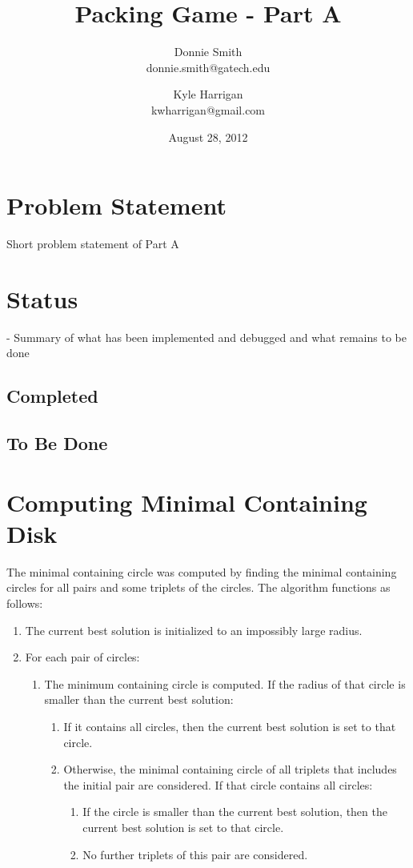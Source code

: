 \documentclass[a4paper]{article}
\title{Packing Game - Part A}
\author{
Donnie Smith \\
donnie.smith@gatech.edu
  \and 
Kyle Harrigan \\
kwharrigan@gmail.com
}
\date{August 28, 2012}                                           %
\begin{document}
\maketitle

 \section{Problem Statement}
  
 Short problem statement of Part A
 
 \section{Status}
  - Summary of what has been implemented and debugged and what remains to be done
  
 \subsection{Completed}
 
 \subsection{To Be Done}
 
\section{Computing Minimal Containing Disk}
The minimal containing circle was computed by finding the minimal containing circles for all pairs and some triplets of the circles.
The algorithm functions as follows:
\begin{enumerate}
	\item The current best solution is initialized to an impossibly large radius.
	\item For each pair of circles:
	\begin{enumerate}
		\item The minimum containing circle is computed.  If the radius of that circle is smaller than the current best solution:
		\begin{enumerate}
			\item If it contains all circles, then the current best solution is set to that circle.
			\item Otherwise, the minimal containing circle of all triplets that includes the initial pair are considered.  If that circle contains all circles:
			\begin{enumerate}
				\item If the circle is smaller than the current best solution, then the current best solution is set to that circle.
				\item No further triplets of this pair are considered.
			\end{enumerate}
		\end{enumerate}
	\end{enumerate}
\end{enumerate}
\end{document}
